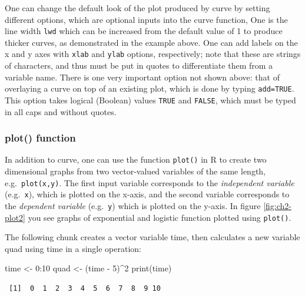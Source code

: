 \documentclass[
  letterpaper,
  DIV=11,
  numbers=noendperiod]{scrreprt}
\newenvironment{Shaded}{\begin{snugshade}}{\end{snugshade}}
\newcommand{\DecValTok}[1]{\textcolor[rgb]{0.68,0.00,0.00}{#1}}
\newcommand{\FunctionTok}[1]{\textcolor[rgb]{0.28,0.35,0.67}{#1}}
\newcommand{\NormalTok}[1]{\textcolor[rgb]{0.00,0.23,0.31}{#1}}
\newcommand{\OtherTok}[1]{\textcolor[rgb]{0.00,0.23,0.31}{#1}}
\newcommand{\SpecialCharTok}[1]{\textcolor[rgb]{0.37,0.37,0.37}{#1}}
\begin{document}
One can change the default look of the plot produced by curve by setting
different options, which are optional inputs into the curve function,
One is the line width \texttt{lwd} which can be increased from the
default value of 1 to produce thicker curves, as demonstrated in the
example above. One can add labels on the x and y axes with \texttt{xlab}
and \texttt{ylab} options, respectively; note that these are strings of
characters, and thus must be put in quotes to differentiate them from a
variable name. There is one very important option not shown above: that
of overlaying a curve on top of an existing plot, which is done by
typing \texttt{add=TRUE}. This option takes logical (Boolean) values
\texttt{TRUE} and \texttt{FALSE}, which must be typed in all caps and
without quotes.

\hypertarget{plot-function}{%
\subsubsection{plot() function}\label{plot-function}}

In addition to curve, one can use the function \texttt{plot()} in R to
create two dimensional graphs from two vector-valued variables of the
same length, e.g.~\texttt{plot(x,y)}. The first input variable
corresponds to the  \emph{independent
variable} (e.g.~\texttt{x}), which is plotted on the x-axis, and the
second variable corresponds to the 
\emph{dependent variable} (e.g.~\texttt{y}) which is plotted on the
y-axis. In figure \ref{fig:ch2-plot2} you see graphs of exponential and
logistic function plotted using \texttt{plot()}.

The following chunk creates a vector variable time, then calculates a
new variable quad using time in a single operation:

\begin{Shaded}
\begin{Highlighting}[]
\NormalTok{time }\OtherTok{\textless{}{-}} \DecValTok{0}\SpecialCharTok{:}\DecValTok{10}
\NormalTok{quad }\OtherTok{\textless{}{-}}\NormalTok{ (time }\SpecialCharTok{{-}} \DecValTok{5}\NormalTok{)}\SpecialCharTok{\^{}}\DecValTok{2}
\FunctionTok{print}\NormalTok{(time)}
\end{Highlighting}
\end{Shaded}

\begin{verbatim}
 [1]  0  1  2  3  4  5  6  7  8  9 10
\end{verbatim}
\end{document}
